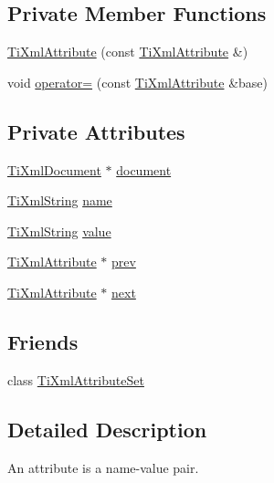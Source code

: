 \subsection*{Private Member Functions}
\begin{DoxyCompactItemize}
\item 
\hyperlink{class_ti_xml_attribute_aee53e434ace7271afc5ce51aeea0b400}{TiXmlAttribute} (const \hyperlink{class_ti_xml_attribute}{TiXmlAttribute} \&)
\item 
void \hyperlink{class_ti_xml_attribute_a83b9c2a47dbfadf5029f2c0f13c18466}{operator=} (const \hyperlink{class_ti_xml_attribute}{TiXmlAttribute} \&base)
\end{DoxyCompactItemize}
\subsection*{Private Attributes}
\begin{DoxyCompactItemize}
\item 
\hyperlink{class_ti_xml_document}{TiXmlDocument} $\ast$ \hyperlink{class_ti_xml_attribute_ada41d3cff50cd33a78072806f88d4433}{document}
\item 
\hyperlink{class_ti_xml_string}{TiXmlString} \hyperlink{class_ti_xml_attribute_af5e5942b90c6ea5506b3d3ab464d0e1c}{name}
\item 
\hyperlink{class_ti_xml_string}{TiXmlString} \hyperlink{class_ti_xml_attribute_ad0e2c2e8eb982d30cb6a89df79b2bb7b}{value}
\item 
\hyperlink{class_ti_xml_attribute}{TiXmlAttribute} $\ast$ \hyperlink{class_ti_xml_attribute_aaf6c6272c625fbf38e571cbf570ea94a}{prev}
\item 
\hyperlink{class_ti_xml_attribute}{TiXmlAttribute} $\ast$ \hyperlink{class_ti_xml_attribute_ae851adf61b80cf45b797fee77dea135f}{next}
\end{DoxyCompactItemize}
\subsection*{Friends}
\begin{DoxyCompactItemize}
\item 
class \hyperlink{class_ti_xml_attribute_a35a7b7f89f708527677d5078d41ce0bf}{TiXmlAttributeSet}
\end{DoxyCompactItemize}


\subsection{Detailed Description}
An attribute is a name-\/value pair. 

